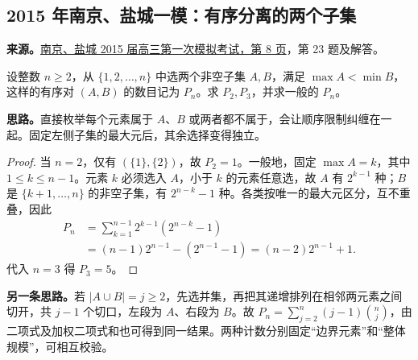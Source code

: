 \documentclass[UTF8,12pt,a4paper,fontset=fandol]{ctexart}
\begin{document}
\subsection{2015 年南京、盐城一模：有序分离的两个子集}\label{sec:c2015ny1}
\textbf{来源。}\href{https://doc.xuehai.net/b440b636eecd6729ce54c837f-8.html}{南京、盐城 2015 届高三第一次模拟考试，第 8 页}，第 23 题及解答。
\begin{example}[题意]
设整数 $n\geq2$，从 $\{1,2,\ldots,n\}$ 中选两个非空子集 $A,B$，满足 $\max A<\min B$，这样的有序对 $(A,B)$ 的数目记为 $P_n$。求 $P_2,P_3$，并求一般的 $P_n$。
\end{example}
\textbf{思路。}直接枚举每个元素属于 $A$、$B$ 或两者都不属于，会让顺序限制纠缠在一起。固定左侧子集的最大元后，其余选择变得独立。
\begin{proof}
当 $n=2$，仅有 $(\{1\},\{2\})$，故 $P_2=1$。一般地，固定 $\max A=k$，其中 $1\leq k\leq n-1$。元素 $k$ 必须选入 $A$，小于 $k$ 的元素任意选，故 $A$ 有 $2^{k-1}$ 种；$B$ 是 $\{k+1,\ldots,n\}$ 的非空子集，有 $2^{n-k}-1$ 种。各类按唯一的最大元区分，互不重叠，因此
\begin{align*}
P_n&=\sum_{k=1}^{n-1}2^{k-1}(2^{n-k}-1)\\
&=(n-1)2^{n-1}-(2^{n-1}-1)
=\boxed{(n-2)2^{n-1}+1}.
\end{align*}
代入 $n=3$ 得 $P_3=5$。
\end{proof}
\textbf{另一条思路。}若 $|A\cup B|=j\geq2$，先选并集，再把其递增排列在相邻两元素之间切开，共 $j-1$ 个切口，左段为 $A$、右段为 $B$。故 $P_n=\sum_{j=2}^{n}(j-1)\binom nj$，由二项式及加权二项式和也可得到同一结果。两种计数分别固定“边界元素”和“整体规模”，可相互校验。
\end{document}
